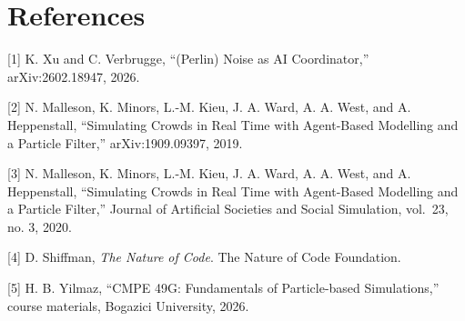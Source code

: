 \documentclass[
  11pt,
]{article}
\begin{document}
\section{References}\label{references}

{[}1{]} K. Xu and C. Verbrugge, ``(Perlin) Noise as AI Coordinator,''
arXiv:2602.18947, 2026.

{[}2{]} N. Malleson, K. Minors, L.-M. Kieu, J. A. Ward, A. A. West, and
A. Heppenstall, ``Simulating Crowds in Real Time with Agent-Based
Modelling and a Particle Filter,'' arXiv:1909.09397, 2019.

{[}3{]} N. Malleson, K. Minors, L.-M. Kieu, J. A. Ward, A. A. West, and
A. Heppenstall, ``Simulating Crowds in Real Time with Agent-Based
Modelling and a Particle Filter,'' Journal of Artificial Societies and
Social Simulation, vol.~23, no. 3, 2020.

{[}4{]} D. Shiffman, \emph{The Nature of Code}. The Nature of Code
Foundation.

{[}5{]} H. B. Yilmaz, ``CMPE 49G: Fundamentals of Particle-based
Simulations,'' course materials, Bogazici University, 2026.
\end{document}
